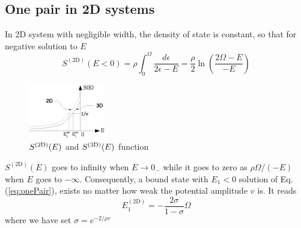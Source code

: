 \documentclass[aps,prb,showpacs,3p,twocolumn]{elsarticle}
\begin{document}
\subsection{One pair in 2D systems}
In 2D system with negligible width, the density of state is constant, so that for negative solution to $E$ 
\begin{equation}
S^{(\text{2D})}(E<0)=\rho\int_0^{\Omega}\frac{d\epsilon}{2\epsilon-E}=\frac{\rho}{2}\ln\left(\frac{2\Omega-E}{-E}\right)
\label{eq:s1pair}
\end{equation}
\begin{figure}[htbp]
	\centering
		\includegraphics[width=0.30\textwidth]{OnePair.eps}
	\caption{$S^{{\text{(2D)}}}(E)$ and $S^{{{\text{(3D)}}}}(E)$ function}
	\label{fig:OnePair}
\end{figure}
$S^{(\text{2D})}(E)$ goes to infinity when $E\rightarrow{}0_{-}$ while it goes to zero as $\rho\Omega/(-E)$ when $E$ goes to $-\infty$. Consequently, a bound state with $E_1<0$ solution of Eq. (\ref{eq:onePair}),  exists no matter how weak the potential amplitude $v$ is. It reads
\begin{equation}
E_1^{(\text{2D})}=-\frac{2\sigma}{1-\sigma}\Omega
\label{eq:}
\end{equation}
where we have set $\sigma=e^{-2/\rho{v}}$
\end{document}
